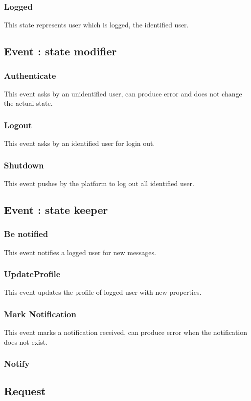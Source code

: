 		\subsubsection{Logged}
			This state represents user which is logged, the identified user.
	\subsection{Event : state modifier}
		\subsubsection{Authenticate}
			This event asks by an unidentified user, can produce error and does not change the actual state.
		\subsubsection{Logout}
			This event asks by an identified user for login out.
		\subsubsection{Shutdown}
			This event pushes by the platform to log out all identified user.
	\subsection{Event : state keeper}
		\subsubsection{Be notified}
			This event notifies a logged user for new messages.
		\subsubsection{UpdateProfile}	
			This event updates the profile of logged user with new properties.
		\subsubsection{Mark Notification}
			This event marks a notification received, can produce error when the notification does not exist.
		\subsubsection{Notify}
	\subsection{Request}
